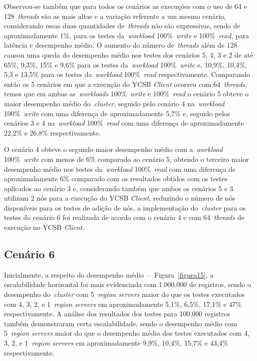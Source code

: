\documentclass[12pt]{article}
\begin{document}
Observou-se também que para todos os cenários as execuções com o uso de 64 e 128~\emph{threads} são as mais altas e a variação referente a um mesmo cenário, considerando essas duas quantidades de~\emph{threads} não são expressivas, sendo de aproximadamente 1\%, para os testes da~\emph{workload} 100\%~\emph{write} e 100\%~\emph{read}, para latência e desempenho médio. 
O aumento do número de~\emph{threads} além de 128 causou uma queda do desempenho médio nos testes dos cenários 5, 4, 3 e 2 de até 65\%, 9,3\%, 15\% e 9,6\% para os testes da~\emph{workload} 100\%~\emph{write} e, 10,9\%, 10,4\%, 5,3 e 13,5\% para os testes da~\emph{workload} 100\%~\emph{read} respectivamente. Comparando então os 5 cenários em que a execução do YCSB \emph{Client} ocorreu com 64~\emph{threads}, temos que em ambas as~\emph{workloads} 100\%~\emph{write} e 100\%~\emph{read} o cenário 5 obteve o maior desempenho médio do~\emph{cluster}, seguido pelo cenário 4 na~\emph{workload} 100\%~\emph{write} com uma diferença de aproximadamente 5,7\% e, seguido pelos cenários 3 e 4 na~\emph{workload} 100\%~\emph{read} com uma diferença de aproximadamente 22,2\% e 26,8\% respectivamente.

O cenário 4 obteve o segundo maior desempenho médio com a~\emph{workload} 100\%~\emph{write} com menos de 6\% comparado ao cenário 5, obtendo o terceiro maior desempenho médio nos testes da~\emph{workload} 100\%~\emph{read} com uma diferença de aproximadamente 6\% comparado com os resultados obtidos com os testes aplicados ao cenário 3 e, considerando também que ambos os cenários 5 e 3 utilizam 2 nós para a execução do YCSB \emph{Client}, reduzindo o número de nós disponíveis para os testes de adição de nós, a implementação do~\emph{cluster} para os testes do cenário 6 foi realizada de acordo com o cenário 4 e com 64~\emph{threads} de execução no YCSB \emph{Client}.

\subsection{Cenário 6}
\label{subsec:resultado-cenario-6}

Inicialmente, a respeito do desempenho médio~--~Figura~\ref{figura15}, a escalabilidade horizontal foi mais evidenciada com 1.000.000 de registros, sendo o desempenho do~\emph{cluster} com 5~\emph{region servers} maior do que os testes executados com 4, 3, 2, e 1~\emph{region servers} em aproximadamente 5,1\%, 6,5\%, 17,1\% e 47\% respectivamente. 
A análise dos resultados dos testes para 100.000 registros também demonstraram certa escalabilidade, sendo o desempenho médio com 5~\emph{region servers} maior do que o desempenho médio dos testes executados com 4, 3, 2, e 1~\emph{region servers} em aproximadamente 9,9\%, 10,4\%, 15,7\% e 43,4\% respectivamente.
\end{document}
